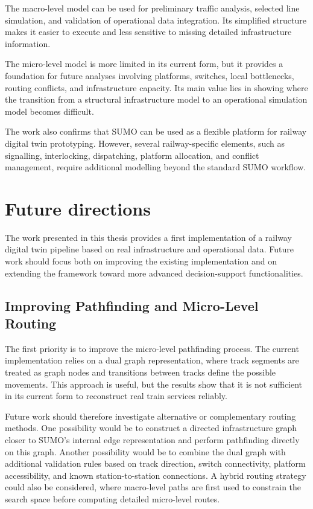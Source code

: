 The macro-level model can be used for preliminary traffic analysis, selected line simulation, and validation of operational 
data integration. Its simplified structure makes it easier to execute and less sensitive to missing detailed infrastructure 
information.

The micro-level model is more limited in its current form, but it provides a foundation for future analyses involving 
platforms, switches, local bottlenecks, routing conflicts, and infrastructure capacity. Its main value lies in showing 
where the transition from a structural infrastructure model to an operational simulation model becomes difficult.

The work also confirms that SUMO can be used as a flexible platform for railway digital twin prototyping. However, several 
railway-specific elements, such as signalling, interlocking, dispatching, platform allocation, and conflict management, 
require additional modelling beyond the standard SUMO workflow.

\section{Future directions}
The work presented in this thesis provides a first implementation of a railway digital twin pipeline based on real 
infrastructure and operational data. Future work should focus both on improving the existing implementation and on 
extending the framework toward more advanced decision-support functionalities.

\subsection{Improving Pathfinding and Micro-Level Routing}
The first priority is to improve the micro-level pathfinding process. The current implementation relies on a dual graph 
representation, where track segments are treated as graph nodes and transitions between tracks define the possible 
movements. This approach is useful, but the results show that it is not sufficient in its current form to reconstruct real 
train services reliably.

Future work should therefore investigate alternative or complementary routing methods. One possibility would be to 
construct a directed infrastructure graph closer to SUMO’s internal edge representation and perform pathfinding directly on 
this graph. Another possibility would be to combine the dual graph with additional validation rules based on track 
direction, switch connectivity, platform accessibility, and known station-to-station connections. A hybrid routing strategy 
could also be considered, where macro-level paths are first used to constrain the search space before computing detailed 
micro-level routes.

